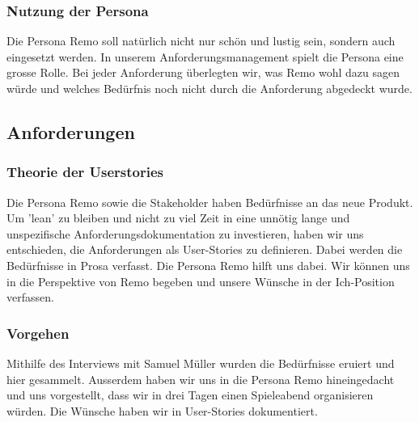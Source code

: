 \subsubsection{Nutzung der Persona}
Die Persona Remo soll natürlich nicht nur schön und lustig sein, sondern auch eingesetzt werden. In unserem Anforderungsmanagement spielt die Persona eine grosse Rolle. Bei jeder Anforderung überlegten wir, was Remo wohl dazu sagen würde und welches Bedürfnis noch nicht durch die Anforderung abgedeckt wurde. 
\newpage
\subsection{Anforderungen}
\subsubsection{Theorie der Userstories}
Die Persona Remo sowie die Stakeholder haben Bedürfnisse an das neue Produkt. Um 'lean' zu bleiben und nicht zu viel Zeit in eine unnötig lange und unspezifische Anforderungsdokumentation zu investieren, haben wir uns entschieden, die Anforderungen als User-Stories zu definieren. Dabei werden die Bedürfnisse in Prosa verfasst. Die Persona Remo hilft uns dabei. Wir können uns in die Perspektive von Remo begeben und unsere Wünsche in der Ich-Position verfassen.
\subsubsection{Vorgehen}
Mithilfe des Interviews mit Samuel Müller wurden die Bedürfnisse eruiert und hier gesammelt. Ausserdem haben wir uns in die Persona Remo hineingedacht und uns vorgestellt, dass wir in drei Tagen einen Spieleabend organisieren würden. Die Wünsche haben wir in User-Stories dokumentiert.
